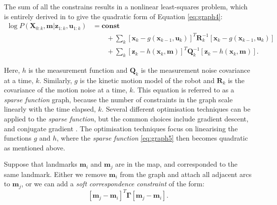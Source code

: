 The sum of all the constrains results in a nonlinear least-squares problem, which is entirely derived in \cite{Thrun2006} to give the quadratic form of Equation \ref{eq:graph4}:
\begin{equation}
\begin{split}
\log P(\mathbf{X}_{0:k}, \mathbf{m}|\mathbf{z}_{1:k}, \mathbf{u}_{1:k}) &= \mathbf{const} \\
                                    &\qquad+ \sum_{k}[\mathbf{x}_k -g(\mathbf{x}_{k-1}, \mathbf{u}_k)]^T \mathbf{R}_k^{-1} [\mathbf{x}_k -g(\mathbf{x}_{k-1}, \mathbf{u}_k)] \\
                                    &\qquad+ \sum_{k}[\mathbf{z}_k -h(\mathbf{x}_{k}, \mathbf{m})]^T \mathbf{Q}_k^{-1} [\mathbf{z}_k -h(\mathbf{x}_{k}, \mathbf{m})].
\end{split}
\label{eq:graph5}
\end{equation}

Here, $h$ is the measurement function and $\mathbf{Q}_k$ is the measurement noise covariance at a time, $k$. Similarly, $g$ is the kinetic motion model of the robot and $\mathbf{R}_k$ is the covariance of the motion noise at a time, $k$. This equation is referred to as a \textit{sparse function} graph, because the number of constraints in the graph scale linearly with the time elapsed, $k$. Several different optimisation techniques can be applied to the \textit{sparse function}, but the common choices include gradient descent, and conjugate gradient \cite{Thrun2006}. The optimisation techniques focus on linearising the functions $g$ and $h$, where the \textit{sparse function} \ref{eq:graph5} then becomes quadratic as mentioned above.

Suppose that landmarks $\mathbf{m}_i$ and $\mathbf{m}_j$ are in the map, and corresponded to the same landmark. Either we remove $\mathbf{m}_i$ from the graph and attach all adjacent arcs to $\mathbf{m}_j$, or we can add a \textit{soft correspondence constraint} of the form:
\begin{equation}
    [\mathbf{m}_j - \mathbf{m}_i]^T \mathbf{\Gamma} [\mathbf{m}_j - \mathbf{m}_i].
\end{equation}

